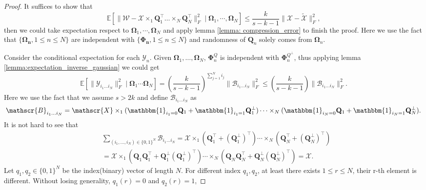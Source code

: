 \begin{proof}
It suffices to show that 
\begin{equation}
\mathbb{E}\left[ \|\mathscr{W} - \mathscr{X}\times_1 \mathbf{Q}_1^\top \dots \times_N \mathbf{Q}_N^\top\|_F^2 \mid \mathbf{\Omega}_1, \cdots, \mathbf{\Omega}_N \right] \le \frac{k}{s-k-1}  \|\mathscr{X} - \tilde{\mathscr{X}}\|_F^2, 
\end{equation}
then we could take expectation respect to $\mathbf{\Omega}_1, \cdots,  \mathbf{\Omega}_N$ and apply lemma \ref{lemma: compression_error} to finish the proof. Here we use the fact that $\{\mathbf{\Omega_n}, 1\le n\le N\}$ are independent with $\{\mathbf{\Phi_n}, 1\le n\le N\}$ and randomness of $\mathbf{Q}_n$ solely comes from $\mathbf{\Omega}_n$. \par 
Consider the conditional expectation for each $\mathscr{Y}_n$. Given $\mathbf{\Omega}_1,\dots, \mathbf{\Omega}_N$, 
$\mathbf{\Phi}_n^Q$ is independent with $\mathbf{\Phi}_n^{Q^\bot}$, thus applying lemma \ref{lemma:expectation_inverse_gaussian} we could get 
\begin{equation}
\mathbb{E} \left[ \|\mathscr{Y}_{i_1\dots i_N}\|_F^2 \mid \mathbf{\Omega}_1 \cdots \mathbf{\Omega}_N \right] = \left(\frac{k}{s-k-1}\right)^{\sum_{j=1}^N i_j} \|\mathscr{B}_{i_1\dots i_N}\|_F^2 \le \left(\frac{k}{s-k-1}\right) \|\mathscr{B}_{i_1\dots i_N}\|_F^2.
\end{equation}
Here we use the fact that we assume $s>2k$ and define $\mathscr{B}_{i_1\dots i_N}$ as
\begin{equation}
\mathscr{B}_{i_1\dots i_N} = \mathscr{X}\times_1 (\mathbbm{1}_{i_1=0}\mathbf{Q}_1 + \mathbbm{1}_{i_1=1}\mathbf{Q}_1^\bot)\cdots\times_N(\mathbbm{1}_{i_N=0}\mathbf{Q}_1 + \mathbbm{1}_{i_N=1}\mathbf{Q}_N^\bot).
\end{equation}
It is not hard to see that
\begin{equation}
\begin{aligned}
&\sum_{(i_1, \dots, i_N) \in \{0,1\}^N} \mathscr{B}_{i_1\dots i_N} = \mathscr{X}\times_1(\mathbf{Q}_1^\top + (\mathbf{Q}_1^\bot)^\top)\cdots\times_N (\mathbf{Q}_N^\top+(\mathbf{Q}_N^\bot)^\top)\\
& = \mathscr{X}\times_1(\mathbf{Q}_1\mathbf{Q}_1^\top + \mathbf{Q}_1^\bot(\mathbf{Q}_1^\bot)^\top)\cdots\times_N (\mathbf{Q}_N \mathbf{Q}_N^\top+\mathbf{Q}_N^\bot(\mathbf{Q}_N^\bot)^\top) = \mathscr{X}.
\end{aligned}
\end{equation}
Let $q_1, q_2 \in \{0,1\}^N$ be the index(binary) vector of length $N$. For different index $q_1, q_2$, at least there exists $1\le r\le N$, their r-th element is different. Without losing generality, $q_1(r) = 0$ and  $q_2(r)=1$, 

\end{proof}
